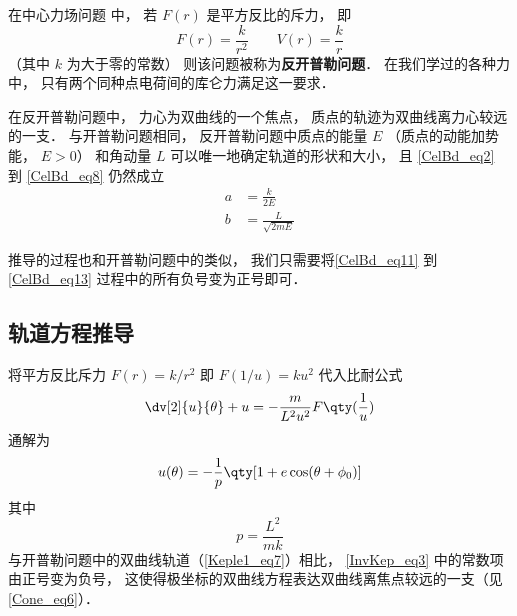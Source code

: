 

在中心力场问题 中， 若 $F(r)$ 是平方反比的斥力， 即
\begin{equation}
F(r) = \frac{k}{r^2}  \qquad V(r) = \frac{k}{r}
\end{equation}
（其中 $k$ 为大于零的常数） 则该问题被称为\textbf{反开普勒问题}． 在我们学过的各种力中， 只有两个同种点电荷间的库仑力满足这一要求．

在反开普勒问题中， 力心为双曲线的一个焦点， 质点的轨迹为双曲线离力心较远的一支． 与开普勒问题相同， 反开普勒问题中质点的能量 $E$ （质点的动能加势能， $E>0$） 和角动量 $L$ 可以唯一地确定轨道的形状和大小， 且 \autoref{CelBd_eq2} 到 \autoref{CelBd_eq8} 仍然成立
\begin{align}
a &= \frac{k}{2E}\\
b &= \frac{L}{\sqrt{2mE}}
\end{align}

推导的过程也和开普勒问题中的类似， 我们只需要将\autoref{CelBd_eq11} 到\autoref{CelBd_eq13} 过程中的所有负号变为正号即可．

\subsection{轨道方程推导}

将平方反比斥力 $F(r) = k/r^2$ 即 $F(1/u) = ku^2$ 代入比耐公式
\begin{equation}
\dv[2]{u}{\theta} + u = -\frac{m}{L^2 u^2} F\qty(\frac 1u)
\end{equation}
通解为
\begin{equation}\label{InvKep_eq3}
u(\theta) = -\frac{1}{p} \qty[1 + e\cos(\theta  + \phi_0)]
\end{equation}
其中
\begin{equation}
p = \frac{L^2}{mk}
\end{equation}
与开普勒问题中的双曲线轨道（\autoref{Keple1_eq7}）相比， \autoref{InvKep_eq3} 中的常数项由正号变为负号， 这使得极坐标的双曲线方程表达双曲线离焦点较远的一支（见\autoref{Cone_eq6}）．